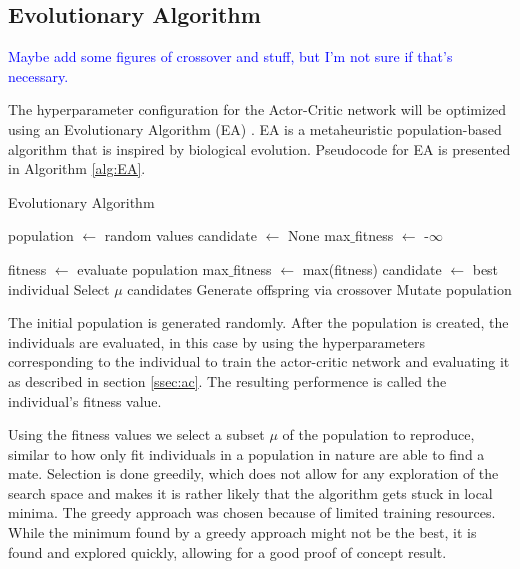 \documentclass{article}
\newcommand{\TODO}[1]{\textcolor{blue}{#1}}
\begin{document}
\subsection{Evolutionary Algorithm} \label{ssec:EA}
\TODO{
    Maybe add some figures of crossover and stuff, but I'm not sure if that's necessary.
    
}

The hyperparameter configuration for the Actor-Critic network will be optimized using an Evolutionary Algorithm (EA) \cite{Simon2013EvolutionaryOA}. EA is a metaheuristic population-based algorithm that is inspired by biological evolution. Pseudocode for EA is presented in Algorithm \ref{alg:EA}.

\begin{algorithm}[htbp]
    \caption{Evolutionary Algorithm}
    \label{alg:EA}
    \begin{algorithmic}[1]
        \STATE population $\gets$ random values
        \STATE candidate $\gets$ None
        \STATE max$\_$fitness $\gets$ -$\infty$
        
            \STATE fitness $\gets$ evaluate population
            	\STATE max$\_$fitness $\gets$ max(fitness)
            	\STATE candidate $\gets$ best individual
            \ENDIF
            \STATE Select $\mu$ candidates
            \STATE Generate offspring via crossover
            \STATE Mutate population
        \ENDFOR        
    \end{algorithmic}
\end{algorithm}


The initial population is generated randomly. After the population is created, the individuals are evaluated, in this case by using the hyperparameters corresponding to the individual to train the actor-critic network and evaluating it as described in section \ref{ssec:ac}. The resulting performence is called the individual's fitness value. 

Using the fitness values we select a subset $\mu$ of the population to reproduce, similar to how only fit individuals in a population in nature are able to find a mate. Selection is done greedily, which does not allow for any exploration of the search space and makes it is rather likely that the algorithm gets stuck in local minima. The greedy approach was chosen because of limited training resources. While the minimum found by a greedy approach might not be the best, it is found and explored quickly, allowing for a good proof of concept result. 
\end{document}
